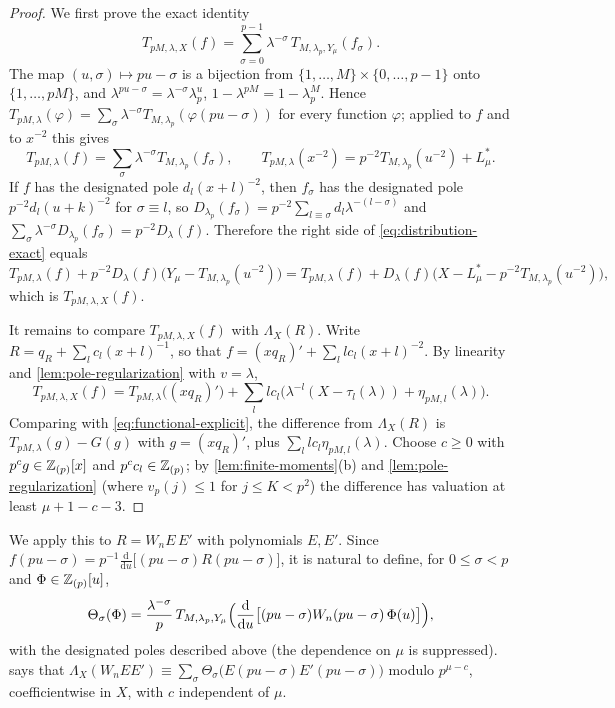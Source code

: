 \begin{proof}
We first prove the exact identity
\begin{equation}\label{eq:distribution-exact}
T_{pM,\lambda,X}(f)=\sum_{\sigma=0}^{p-1}\lambda^{-\sigma}\,T_{M,\lambda_p,Y_\mu}(f_\sigma).
\end{equation}
The map $(u,\sigma)\mapsto pu-\sigma$ is a bijection from $\{1,\dots,M\}\times\{0,\dots,p-1\}$ onto $\{1,\dots,pM\}$, and $\lambda^{pu-\sigma}=\lambda^{-\sigma}\lambda_p^u$, $1-\lambda^{pM}=1-\lambda_p^M$. Hence $T_{pM,\lambda}(\varphi)=\sum_\sigma\lambda^{-\sigma}T_{M,\lambda_p}(\varphi(pu-\sigma))$ for every function $\varphi$; applied to $f$ and to $x^{-2}$ this gives
\[
T_{pM,\lambda}(f)=\sum_\sigma\lambda^{-\sigma}T_{M,\lambda_p}(f_\sigma),\qquad T_{pM,\lambda}(x^{-2})=p^{-2}T_{M,\lambda_p}(u^{-2})+L^*_\mu .
\]
If $f$ has the designated pole $d_l(x+l)^{-2}$, then $f_\sigma$ has the designated pole $p^{-2}d_l(u+k)^{-2}$ for $\sigma\equiv l$, so $D_{\lambda_p}(f_\sigma)=p^{-2}\sum_{l\equiv\sigma}d_l\lambda^{-(l-\sigma)}$ and $\sum_\sigma\lambda^{-\sigma}D_{\lambda_p}(f_\sigma)=p^{-2}D_\lambda(f)$. Therefore the right side of \eqref{eq:distribution-exact} equals
\[
T_{pM,\lambda}(f)+p^{-2}D_\lambda(f)\bigl(Y_\mu-T_{M,\lambda_p}(u^{-2})\bigr)=T_{pM,\lambda}(f)+D_\lambda(f)\bigl(X-L^*_\mu-p^{-2}T_{M,\lambda_p}(u^{-2})\bigr),
\]
which is $T_{pM,\lambda,X}(f)$.

It remains to compare $T_{pM,\lambda,X}(f)$ with $\Lambda_X(R)$. Write $R=q_R+\sum_lc_l(x+l)^{-1}$, so that $f=(xq_R)'+\sum_l lc_l(x+l)^{-2}$. By linearity and \cref{lem:pole-regularization} with $v=\lambda$,
\[
T_{pM,\lambda,X}(f)=T_{pM,\lambda}\bigl((xq_R)'\bigr)+\sum_llc_l\bigl(\lambda^{-l}(X-\tau_l(\lambda))+\eta_{pM,l}(\lambda)\bigr).
\]
Comparing with \eqref{eq:functional-explicit}, the difference from $\Lambda_X(R)$ is $T_{pM,\lambda}(g)-G(g)$ with $g=(xq_R)'$, plus $\sum_llc_l\eta_{pM,l}(\lambda)$. Choose $c\ge0$ with $p^cg\in\mathbb{Z}_{(p)}[x]$ and $p^cc_l\in\mathbb{Z}_{(p)}$; by \cref{lem:finite-moments}(b) and \cref{lem:pole-regularization} (where $v_p(j)\le1$ for $j\le K<p^2$) the difference has valuation at least $\mu+1-c-3$.
\end{proof}

We apply this to $R=W_nE\,E'$ with polynomials $E,E'$. Since $f(pu-\sigma)=p^{-1}\frac{\mathrm d}{\mathrm du}\bigl[(pu-\sigma)R(pu-\sigma)\bigr]$, it is natural to define, for $0\le\sigma<p$ and $\Phi\in\mathbb{Z}_{(p)}[u]$,
\begin{equation}\label{eq:class-term}
\Theta_\sigma(\Phi)=\frac{\lambda^{-\sigma}}{p}\,T_{M,\lambda_p,Y_\mu}\Bigl(\frac{\mathrm d}{\mathrm du}\bigl[(pu-\sigma)W_n(pu-\sigma)\,\Phi(u)\bigr]\Bigr),
\end{equation}
with the designated poles described above (the dependence on $\mu$ is suppressed).  says that $\Lambda_X(W_nEE')\equiv\sum_\sigma\Theta_\sigma\bigl(E(pu-\sigma)E'(pu-\sigma)\bigr)$ modulo $p^{\mu-c}$, coefficientwise in $X$, with $c$ independent of $\mu$.

